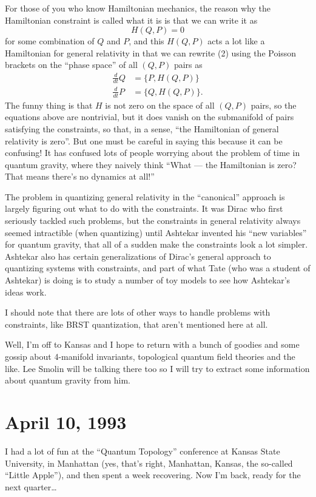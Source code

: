 \documentclass{article}
\begin{document}
For those of you who know Hamiltonian mechanics, the reason why the
Hamiltonian constraint is called what it is is that we can write it as
\[H(Q,P) = 0\] for some combination of \(Q\) and \(P\), and this
\(H(Q,P)\) acts a lot like a Hamiltonian for general relativity in that
we can rewrite (2) using the Poisson brackets on the ``phase space'' of
all \((Q,P)\) pairs as
\[\begin{aligned}\frac{d}{dt}Q &= \{P,H(Q,P)\} \\ \frac{d}{dt}P &= \{Q,H(Q,P)\}.\end{aligned}\]
The funny thing is that \(H\) is not zero on the space of all \((Q,P)\)
pairs, so the equations above are nontrivial, but it does vanish on the
submanifold of pairs satisfying the constraints, so that, in a sense,
``the Hamiltonian of general relativity is zero''. But one must be
careful in saying this because it can be confusing! It has confused lots
of people worrying about the problem of time in quantum gravity, where
they naively think ``What --- the Hamiltonian is zero? That means
there's no dynamics at all!''

The problem in quantizing general relativity in the ``canonical''
approach is largely figuring out what to do with the constraints. It was
Dirac who first seriously tackled such problems, but the constraints in
general relativity always seemed intractible (when quantizing) until
Ashtekar invented his ``new variables'' for quantum gravity, that all of
a sudden make the constraints look a lot simpler. Ashtekar also has
certain generalizations of Dirac's general approach to quantizing
systems with constraints, and part of what Tate (who was a student of
Ashtekar) is doing is to study a number of toy models to see how
Ashtekar's ideas work.

I should note that there are lots of other ways to handle problems with
constraints, like BRST quantization, that aren't mentioned here at all.

Well, I'm off to Kansas and I hope to return with a bunch of goodies and
some gossip about 4-manifold invariants, topological quantum field
theories and the like. Lee Smolin will be talking there too so I will
try to extract some information about quantum gravity from him.
\hypertarget{week12}{%
\section{April 10, 1993}\label{week12}}

I had a lot of fun at the ``Quantum Topology'' conference at Kansas
State University, in Manhattan (yes, that's right, Manhattan, Kansas,
the so-called ``Little Apple''), and then spent a week recovering. Now
I'm back, ready for the next quarter\ldots{}
\end{document}
